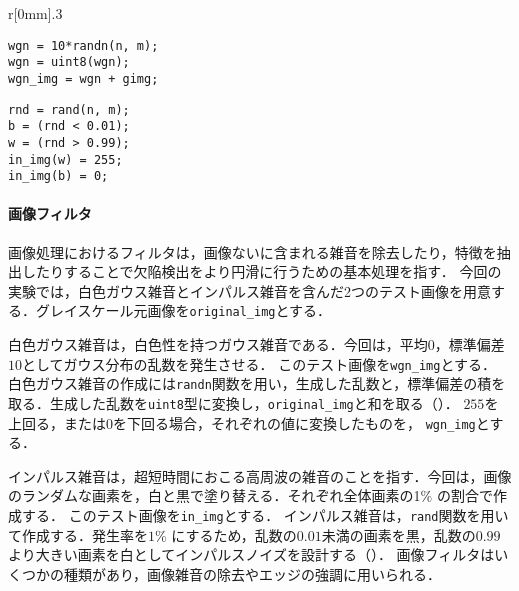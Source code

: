 \begin{wrapfigure}{r}[0mm]{.3\textwidth}
    \vspace{-1cm}
    \begin{lstlisting}[caption={白色ガウス雑音画像の生成},label={src:白色ガウス雑音画像の生成}]
% 画像サイズ : n x m
wgn = 10*randn(n, m);
wgn = uint8(wgn);
wgn_img = wgn + gimg;
    \end{lstlisting}
    \begin{lstlisting}[caption={インパルス雑音画像の生成},label={src:インパルス雑音画像の生成}]
% 画像サイズ : n x m
rnd = rand(n, m);
b = (rnd < 0.01);
w = (rnd > 0.99);
in_img(w) = 255;
in_img(b) = 0;
    \end{lstlisting}
    \vspace{-.5cm}
\end{wrapfigure}
\paragraph{画像フィルタ}
画像処理におけるフィルタは，画像ないに含まれる雑音を除去したり，特徴を抽出したりすることで欠陥検出をより円滑に行うための基本処理を指す\cite{画像フィルタ}．
\newcommand{\originimg}{\texttt{original\_img}}
\newcommand{\wgnimg}{\texttt{wgn\_img}}
\newcommand{\inimg}{\texttt{in\_img}}
今回の実験では，白色ガウス雑音とインパルス雑音を含んだ2つのテスト画像を用意する．グレイスケール元画像を\originimg とする．\par
白色ガウス雑音は，白色性を持つガウス雑音である．今回は，平均\(0\)，標準偏差\(10\)としてガウス分布の乱数を発生させる．
このテスト画像を\wgnimg とする．
白色ガウス雑音の作成には\texttt{randn}関数を用い，生成した乱数と，標準偏差の積を取る．生成した乱数を\texttt{uint8}型に変換し，\originimg と和を取る（）．
\(255\)を上回る，または\(0\)を下回る場合，それぞれの値に変換したものを， \wgnimg とする．\par
インパルス雑音は，超短時間におこる高周波の雑音のことを指す．今回は，画像のランダムな画素を，白と黒で塗り替える．それぞれ全体画素の1\(\%\) の割合で作成する．
このテスト画像を\inimg とする．
インパルス雑音は，\texttt{rand}関数を用いて作成する．発生率を\(1\%\) にするため，乱数の\(0.01\)未満の画素を黒，乱数の\(0.99\)より大きい画素を白としてインパルスノイズを設計する（）．
画像フィルタはいくつかの種類があり，画像雑音の除去やエッジの強調に用いられる．
